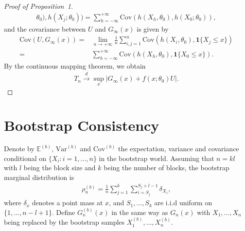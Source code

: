 \documentclass[12pt]{article}
\begin{document}
\begin{proof}[Proof of Proposition~1]
\begin{align*}
\theta_0),h(X_j;\theta_0))
= \sum^{+\infty}_{h=-\infty}\text{Cov}(h(X_{h},\theta_0),h(X_0;\theta_0)),
\end{align*}
and the covariance between $U$ and $G_{\infty}(x)$ is given by
\begin{align*}
\text{Cov}(U,G_\infty(x))=&\lim_{n\rightarrow+\infty}
\frac{1}{n}\sum^{n}_{i,j=1}\text{Cov}(h(X_i,\theta_0),\mathbf{1}\{X_j\leq x\})
\\=&\sum^{+\infty}_{h=-\infty}
\text{Cov}(h(X_{h},\theta_0),\mathbf{1}\{X_0\leq x\}).
\end{align*}
By the continuous mapping theorem, we obtain
\begin{align*}
T_n \overset{d}{\rightarrow} \sup_x |G_{\infty}(x)+f(x;\theta_0)U|.    
\end{align*}

\end{proof}

\section{Bootstrap Consistency}

Denote by $\mathbb{E}^{(b)}$, $\text{Var}^{(b)}$ and $\text{Cov}^{(b)}$
the expectation, variance and covariance conditional on 
$\{X_i: i = 1, \ldots, n\}$ in 
the bootstrap world. Assuming that $n=kl$ with $l$ being the block size and $k$ 
being the number of blocks, the bootstrap marginal distribution is 
\begin{align*}
\rho_n^{(b)}=\frac{1}{n}\sum^{k}_{j=1}\sum^{S_j+l-1}_{i=S_j} \delta_{X_i},    
\end{align*}
where $\delta_x$ denotes a point mass at $x$, and $S_1,\dots,S_k$ are i.i.d 
uniform on $\{1,\dots,n-l+1\}$. 
Define $G_n^{(b)}(x)$ in the same way as $G_n(x)$ with $X_1, \dots, X_n$ being 
replaced by the bootstrap samples %
$X_1^{(b)},\dots,X_n^{(b)}.$
\end{document}
